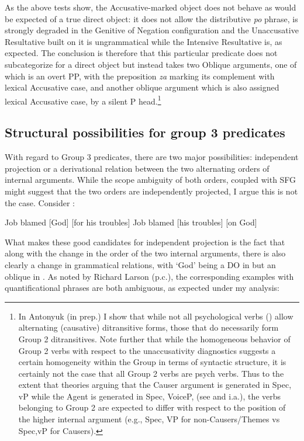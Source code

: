 \documentclass[output=paper,colorlinks,citecolor=brown]{./langscibook}
\begin{document}
As the above tests show, the Accusative-marked object does not behave as would be expected of a true direct object: it does not allow the distributive \textit{po} phrase, is strongly degraded in the Genitive of Negation configuration and the Unaccusative Resultative built on it is ungrammatical while the Intensive Resultative is, as expected. The conclusion is therefore that this particular predicate does not subcategorize for a direct object but instead takes two Oblique arguments, one of which is an overt PP, with the preposition \textit{za} marking its complement with lexical Accusative case, and another oblique argument which is also assigned lexical Accusative case, by a silent P head.\footnote{In Antonyuk (in prep.) I show that while not all psychological verbs (\citealt{BellettiRizzi1988}) allow alternating (causative) ditransitive forms, those that do necessarily form Group 2 ditransitives. Note further that while the homogeneous behavior of Group 2 verbs with respect to the unaccusativity diagnostics suggests a certain homogeneity within the Group in terms of syntactic structure, it is certainly not the case that all Group 2 verbs are psych verbs. Thus to the extent that theories arguing that the Causer argument is generated in Spec, vP while the Agent is generated in Spec, VoiceP, (see \citealt{Kratzer2005} and \citealt{AlexiadouEtAl2006} i.a.), the verbs belonging to Group 2 are expected to differ with respect to the position of the higher internal argument (e.g., Spec, VP for non-Causers/Themes vs Spec,vP for Causers).}

\subsection{Structural possibilities for group 3 predicates}\label{sec:antonyuk:4.3}

With regard to Group 3 predicates, there are two major possibilities: independent projection or a derivational relation between the two alternating orders of internal arguments. While the scope ambiguity of both orders, coupled with SFG might suggest that the two orders are independently projected, I argue this is not the case. Consider :


\ea%
    \label{ex:antonyuk:56}
    \ea \label{ex:antonyuk:56a}
    Job blamed [God] [for his troubles] \hfill \citep{Larson1990}
    \ex \label{ex:antonyuk:56b}
    Job blamed [his troubles] [on God]
    \z
\z

What makes these good candidates for independent projection is the fact that along with the change in the order of the two internal arguments, there is also clearly a change in grammatical relations, with ‘God’ being a DO in  but an oblique in . As noted by Richard Larson (p.c.), the corresponding examples with quantificational phrases are both ambiguous, as expected under my analysis:
\end{document}
